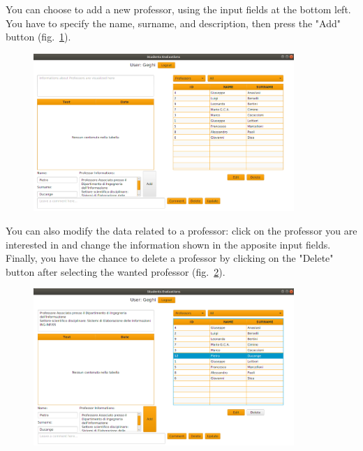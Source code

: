 \documentclass[a4paper, oneside]{article}
\begin{document}
You can choose to add a new professor, using the input fields at the bottom left. You have to specify the name, surname, and description, then press the "Add" button (fig.~\ref{fig:admin1}).
\begin{figure}[h]
\centering
\includegraphics[width=0.88\textwidth]{images/screens/admin1}
\label{fig:admin1}
\end{figure}
\clearpage
You can also modify the data related to a professor: click on the professor you are interested in and change the information shown in the apposite input fields. Finally, you have the chance to delete a professor by clicking on the "Delete" button after selecting the wanted professor (fig.~\ref{fig:admin2}).
\begin{figure}[h]
\centering
\includegraphics[width=0.88\textwidth]{images/screens/admin2}
\label{fig:admin2}
\end{figure}
\end{document}
